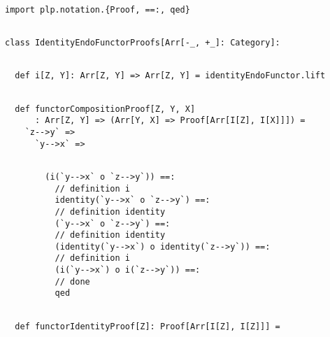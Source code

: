 \documentclass[11pt]{article}
\begin{document}
\vspace{6pt}
\begin{mdframed}[backgroundcolor=lightgray!20] 
\begin{lstlisting}

import plp.notation.{Proof, ==:, qed}
\end{lstlisting}
\end{mdframed}
\vspace{6pt}
\begin{mdframed}[backgroundcolor=lightgray!20] 
\begin{lstlisting}

class IdentityEndoFunctorProofs[Arr[-_, +_]: Category]:
\end{lstlisting}
\end{mdframed}
\vspace{6pt}
\begin{mdframed}[backgroundcolor=lightgray!20] 
\begin{lstlisting}

  def i[Z, Y]: Arr[Z, Y] => Arr[Z, Y] = identityEndoFunctor.lift
\end{lstlisting}
\end{mdframed}
\vspace{6pt}
\begin{mdframed}[backgroundcolor=lightgray!20] 
\begin{lstlisting}

  def functorCompositionProof[Z, Y, X]
      : Arr[Z, Y] => (Arr[Y, X] => Proof[Arr[I[Z], I[X]]]) =
    `z-->y` =>
      `y-->x` =>
\end{lstlisting}
\end{mdframed}
\vspace{6pt}
\begin{mdframed}[backgroundcolor=lightgray!20] 
\begin{lstlisting}

        (i(`y-->x` o `z-->y`)) ==:
          // definition i
          identity(`y-->x` o `z-->y`) ==:
          // definition identity
          (`y-->x` o `z-->y`) ==:
          // definition identity
          (identity(`y-->x`) o identity(`z-->y`)) ==:
          // definition i
          (i(`y-->x`) o i(`z-->y`)) ==:
          // done
          qed
\end{lstlisting}
\end{mdframed}
\vspace{6pt}
\begin{mdframed}[backgroundcolor=lightgray!20] 
\begin{lstlisting}

  def functorIdentityProof[Z]: Proof[Arr[I[Z], I[Z]]] =
\end{lstlisting}
\end{mdframed}
\end{document}

